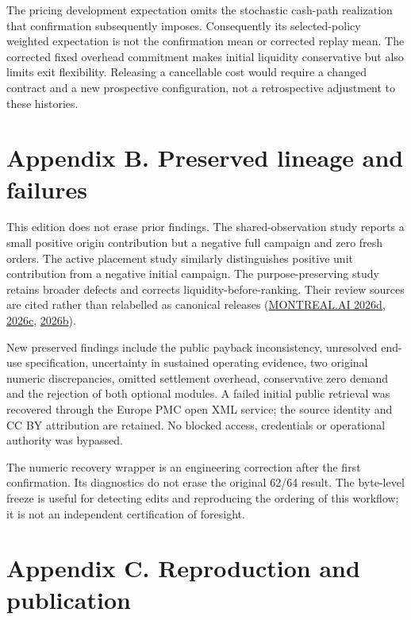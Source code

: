 \documentclass[
  11pt,
  letterpaper,
]{article}
\begin{document}
The pricing development expectation omits the stochastic cash-path
realization that confirmation subsequently imposes. Consequently its
selected-policy weighted expectation is not the confirmation mean or
corrected replay mean. The corrected fixed overhead commitment makes
initial liquidity conservative but also limits exit flexibility.
Releasing a cancellable cost would require a changed contract and a new
prospective configuration, not a retrospective adjustment to these
histories.

\hypertarget{appendix-b.-preserved-lineage-and-failures}{%
\section{Appendix B. Preserved lineage and
failures}\label{appendix-b.-preserved-lineage-and-failures}}

This edition does not erase prior findings. The shared-observation study
reports a small positive origin contribution but a negative full
campaign and zero fresh orders. The active placement study similarly
distinguishes positive unit contribution from a negative initial
campaign. The purpose-preserving study retains broader defects and
corrects liquidity-before-ranking. Their review sources are cited rather
than relabelled as canonical releases
(\protect\hyperlink{ref-prior4981}{MONTREAL.AI 2026d},
\protect\hyperlink{ref-prior4996}{2026c},
\protect\hyperlink{ref-prior4979}{2026b}).

New preserved findings include the public payback inconsistency,
unresolved end-use specification, uncertainty in sustained operating
evidence, two original numeric discrepancies, omitted settlement
overhead, conservative zero demand and the rejection of both optional
modules. A failed initial public retrieval was recovered through the
Europe PMC open XML service; the source identity and CC BY attribution
are retained. No blocked access, credentials or operational authority
was bypassed.

The numeric recovery wrapper is an engineering correction after the
first confirmation. Its diagnostics do not erase the original 62/64
result. The byte-level freeze is useful for detecting edits and
reproducing the ordering of this workflow; it is not an independent
certification of foresight.

\hypertarget{appendix-c.-reproduction-and-publication}{%
\section{Appendix C. Reproduction and
publication}\label{appendix-c.-reproduction-and-publication}}
\end{document}
